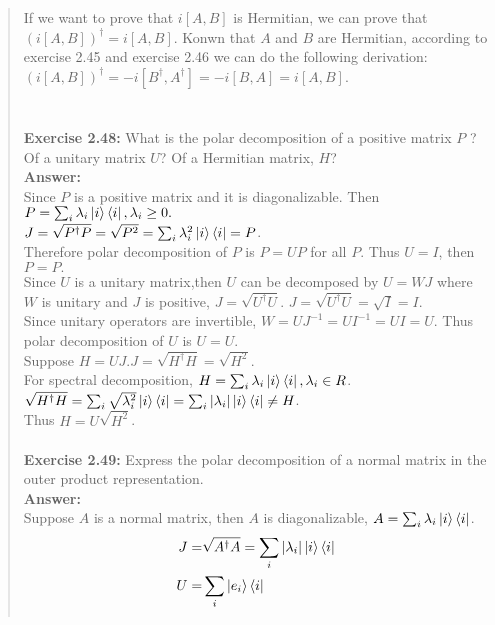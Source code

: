 \documentclass[UTF8]{ctexart}
\begin{document}
\begin{quote}
If we want to prove that $i[A, B]$ is Hermitian, we can prove that $(i[A, B])^{\dagger}=i[A, B]$.
 Konwn that $A$ and $B$ are Hermitian, according to exercise 2.45 and exercise 2.46
 we can do the following derivation: \\
$(i[A, B])^{\dagger}= -i[B^{\dagger}, A^{\dagger}]=-i[B,A]=i[A,B]$.\\
\\
\\
\textbf{Exercise 2.48: } What is the polar decomposition of a positive matrix $P$ ? 
Of a unitary matrix $U$?
Of a Hermitian matrix, $H$?
 \\
\textbf{Answer:}\\
Since $P$ is a positive matrix and it is diagonalizable. Then $P=\sum_{i}\lambda_{i}\ket{i}\bra{i},\lambda_{i}\geq0. $\\
$J=\sqrt{P^{\dagger}P}=\sqrt{P^{2}} =\sum_{i}\lambda_{i}^{2}\ket{i}\bra{i}=P$.\\
Therefore polar decomposition of $P$ is $P = UP$ for all $P$. Thus $U = I$, then $P = P.$
\\
Since $U$ is a unitary matrix,then $U$ can be decomposed by $U=WJ$ where $W$ is unitary and $J$ is positive, $J=\sqrt{U^{\dagger}U}$.
$J=\sqrt{U^{\dagger}U}=\sqrt{I}=I.$\\
Since unitary operators are invertible, $W = UJ^{−1} = UI^{−1} = UI = U$. Thus polar decomposition of $U$ is $U = U$.
\\
Suppose $H = UJ.$$J=\sqrt{H^{\dagger}H}=\sqrt{H^{2}}$.\\
For spectral decomposition, $H=\sum_{i}\lambda_{i}\ket{i}\bra{i},\lambda_{i}\in R$.\\
$\sqrt{H^{\dagger}H}=\sum_{i}\sqrt{\lambda_{i}^{2}}\ket{i}\bra{i}=\sum_{i}|\lambda_{i}|\ket{i}\bra{i}\neq H$.\\
Thus $H=U\sqrt{H^{2}}$.
\\
\\
\textbf{Exercise 2.49: } Express the polar decomposition of a normal matrix in the outer product representation.
\\
\textbf{Answer:}\\
Suppose $A$ is a normal matrix, then $A$ is diagonalizable, $A=\sum_{i}\lambda_{i}\ket{i}\bra{i}$.\\
\begin{equation}
	\begin{aligned}
J=&\sqrt{A^{\dagger}A}=\sum_{i}|\lambda_{i}|\ket{i}\bra{i}\\
U=&\sum_{i}\ket{e_{i}}\bra{i}\\

\end{aligned}
\end{equation}$$
\end{quote}
\end{document}
